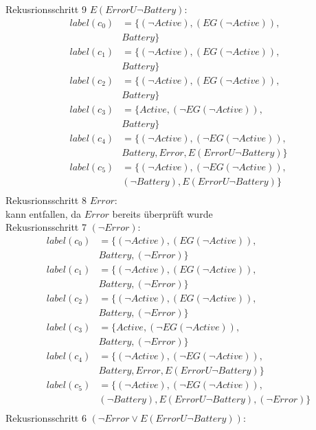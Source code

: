 Rekusrionsschritt 9 $E(Error U \neg Battery)$:
\begin{align*}
label(c_0)&=\{(\neg Active),(EG(\neg Active)),\\
&Battery\}\\
label(c_1)&=\{(\neg Active),(EG(\neg Active)),\\
&Battery\}\\
label(c_2)&=\{(\neg Active),(EG(\neg Active)),\\
&Battery\}\\
label(c_3)&=\{Active,(\neg EG(\neg Active)),\\
&Battery\}\\
label(c_4)&=\{(\neg Active),(\neg EG(\neg Active)),\\
&Battery,Error,E(Error U \neg Battery)\}\\
label(c_5)&=\{(\neg Active),(\neg EG(\neg Active)),\\
&(\neg Battery),E(Error U \neg Battery)\}\\
\end{align*}
Rekusrionsschritt 8 $Error$:\\
kann entfallen, da $Error$ bereits überprüft wurde\\
Rekusrionsschritt 7 $(\neg Error)$:
\begin{align*}
label(c_0)&=\{(\neg Active),(EG(\neg Active)),\\
&Battery,(\neg Error)\}\\
label(c_1)&=\{(\neg Active),(EG(\neg Active)),\\
&Battery,(\neg Error)\}\\
label(c_2)&=\{(\neg Active),(EG(\neg Active)),\\
&Battery,(\neg Error)\}\\
label(c_3)&=\{Active,(\neg EG(\neg Active)),\\
&Battery,(\neg Error)\}\\
label(c_4)&=\{(\neg Active),(\neg EG(\neg Active)),\\
&Battery,Error,E(Error U \neg Battery)\}\\
label(c_5)&=\{(\neg Active),(\neg EG(\neg Active)),\\
&(\neg Battery),E(Error U \neg Battery),(\neg Error)\}\\
\end{align*}
Rekusrionsschritt 6 $(\neg Error \vee E(Error U \neg Battery))$:
